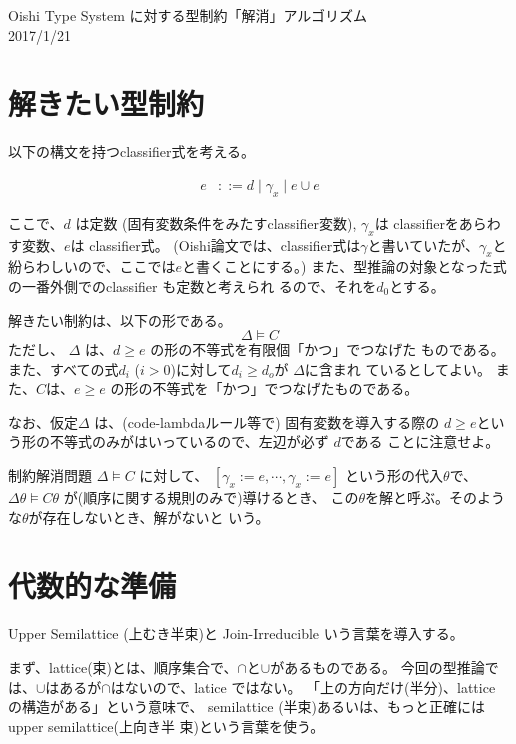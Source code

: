 \documentclass[dvipdfmx]{jsarticle}
\begin{document}
\begin{center}
  Oishi Type System に対する型制約「解消」アルゴリズム  \\
  2017/1/21
\end{center}

\section{解きたい型制約}

以下の構文を持つclassifier式を考える。

\begin{align*}
e & ::= d \mid \gamma_x \mid e \cup e 
\end{align*}

ここで、$d$ は定数 (固有変数条件をみたすclassifier変数), $\gamma_x$は
classifierをあらわす変数、$e$は classifier式。
(Oishi論文では、classifier式は$\gamma$と書いていたが、$\gamma_x$と
紛らわしいので、ここでは$e$と書くことにする。)
また、型推論の対象となった式の一番外側でのclassifier も定数と考えられ
るので、それを$d_0$とする。

解きたい制約は、以下の形である。
\[
\Delta \models C
\]
ただし、 $\Delta$ は、$d \ge e$ の形の不等式を有限個「かつ」でつなげた
ものである。
また、すべての式$d_i$ ($i>0$)に対して$d_i \ge d_o$が $\Delta$に含まれ
ているとしてよい。
また、$C$は、$e \ge e$ の形の不等式を「かつ」でつなげたものである。

なお、仮定$\Delta$ は、(code-lambdaルール等で) 固有変数を導入する際の
$d \ge e$という形の不等式のみがはいっているので、左辺が必ず $d$である
ことに注意せよ。


制約解消問題 $ \Delta \models C $ に対して、
$[\gamma_x := e,\cdots,\gamma_x:=e]$ という形の代入$\theta$で、
$ \Delta\theta \models C\theta $ が(順序に関する規則のみで)導けるとき、
この$\theta$を解と呼ぶ。そのような$\theta$が存在しないとき、解がないと
いう。

\section{代数的な準備}

Upper Semilattice (上むき半束)と Join-Irreducible いう言葉を導入する。

まず、lattice(束)とは、順序集合で、$\cap$と$\cup$があるものである。
今回の型推論では、$\cup$はあるが$\cap$はないので、latice ではない。
「上の方向だけ(半分)、lattice の構造がある」という意味で、
semilattice (半束)あるいは、もっと正確には upper semilattice(上向き半
束)という言葉を使う。
\end{document}
